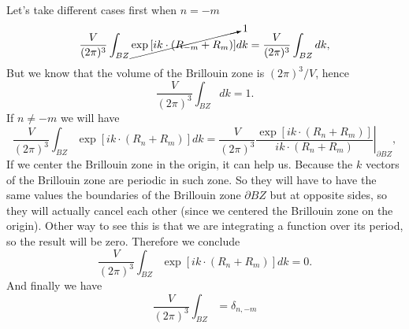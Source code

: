\begin{questions}
\begin{solution}
\begin{equation}
  \end{equation}
\end{solution}
\begin{solution}
  Let's take different cases first when $n = -m$
  \begin{equation}
    \frac{V}{(2\pi)^3}\int_{BZ} \cancelto{1}{\exp{[ik\cdot(R_{-m} + R_m)]}}dk = \frac{V}{(2\pi)^3} \int_{BZ} dk,
  \end{equation}
  But we know that the volume of the Brillouin zone is $(2\pi)^3/V$, hence
  \begin{equation}
    \frac{V}{(2\pi)^3} \int_{BZ} dk = 1.
  \end{equation}
  If $n\neq-m$ we will have
  \begin{equation}
    \frac{V}{(2\pi)^3}\int_{BZ} \exp{[ik\cdot(R_{n} + R_m)]}dk = \frac{V}{(2\pi)^3} \left.\frac{\exp{[ik\cdot(R_{n} + R_m)]}}{ik\cdot(R_{n} + R_m)}\right|_{\partial BZ},
  \end{equation}
  If we center the Brillouin zone in the origin, it can help us. Because the $k$ vectors of the Brillouin zone are periodic in such zone. So they will have to have the same values the boundaries of the Brillouin zone $\partial BZ$ but at opposite sides, so they will actually cancel each other (since we centered the Brillouin zone on the origin). Other way to see this is that we are integrating a function over its period, so the result will be zero. Therefore we conclude
  \begin{equation}
    \frac{V}{(2\pi)^3}\int_{BZ} \exp{[ik\cdot(R_{n} + R_m)]}dk = 0.
  \end{equation}
  And finally we have
  \begin{equation}
    \frac{V}{(2\pi)^3}\int_{BZ} = \delta_{n,-m}
  \end{equation}
\end{solution}


\end{questions}
